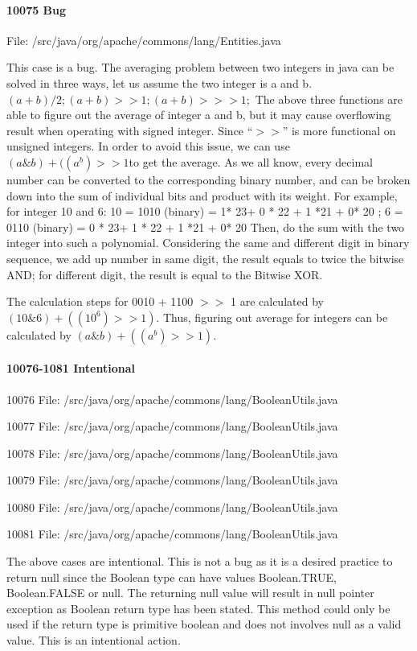 \documentclass[12pt]{article}
\begin{document}
{{\paragraph{10075 Bug}
File: /src/java/org/apache/commons/lang/Entities.java

This case is a bug. The averaging problem between two integers in java can be solved in three ways, let us assume the two integer is a and b.
$ (a + b) / 2;(a + b) >> 1;(a + b) >>> 1;$
The above three functions are able to figure out the average of integer a and b, but it may cause overflowing result when operating with signed integer. Since $“>>”$ is more functional on unsigned integers. In order to avoid this issue, we can use $(a \& b) + ((a ^ b) >> 1 $to get the average.
As we all know, every decimal number can be converted to the corresponding binary number, and can be broken down into the sum of individual bits and product with its weight. For example, for integer 10 and 6:
10 = 1010 (binary) = 1* 23+ 0 * 22 + 1 *21 + 0* 20 ; 6 = 0110 (binary) = 0 * 23+ 1 * 22 + 1 *21 + 0* 20
Then, do the sum with the two integer into such a polynomial. Considering the same and different digit in binary sequence, we add up number in same digit, the result equals to twice the bitwise AND; for different digit, the result is equal to the Bitwise XOR.

The calculation steps for 0010 + 1100 $>>$ 1 are calculated by $(10 \& 6) + ((10 ^ 6) >> 1)$. Thus, figuring out average for integers can be calculated by $(a \& b) + ((a ^ b) >> 1)$.

\paragraph{10076-1081 Intentional}

10076
File: /src/java/org/apache/commons/lang/BooleanUtils.java
 
   10077
File: /src/java/org/apache/commons/lang/BooleanUtils.java

10078
File: /src/java/org/apache/commons/lang/BooleanUtils.java

10079
File: /src/java/org/apache/commons/lang/BooleanUtils.java

10080
File: /src/java/org/apache/commons/lang/BooleanUtils.java

10081
File: /src/java/org/apache/commons/lang/BooleanUtils.java

The above cases are intentional. This  is  not  a  bug  as  it  is  a  desired  practice  to  return  null  since  the  Boolean  
type  can  have  values   Boolean.TRUE,  Boolean.FALSE  or  null. The returning null value will result in null pointer exception as Boolean return type has been stated. This  method   could only  be  used   if  the  return  type  is  primitive boolean  and does not involves null  as  a  valid   value.  This  is  an intentional action.

}}
\end{document}
